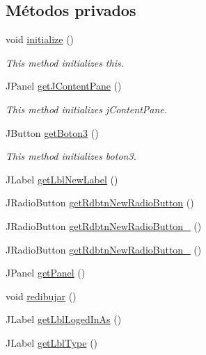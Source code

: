 \subsection*{Métodos privados}
\begin{DoxyCompactItemize}
\item 
void \mbox{\hyperlink{classgui_1_1_main_g_u_i_a2659b4cdf4e94d6ffc332f16afc46462}{initialize}} ()
\begin{DoxyCompactList}\small\item\em This method initializes this. \end{DoxyCompactList}\item 
J\+Panel \mbox{\hyperlink{classgui_1_1_main_g_u_i_ae3ce89a59dcf27273ec658ee42cd61b8}{get\+J\+Content\+Pane}} ()
\begin{DoxyCompactList}\small\item\em This method initializes j\+Content\+Pane. \end{DoxyCompactList}\item 
J\+Button \mbox{\hyperlink{classgui_1_1_main_g_u_i_a57ef624d5e53ea6591fdf4dfc776b399}{get\+Boton3}} ()
\begin{DoxyCompactList}\small\item\em This method initializes boton3. \end{DoxyCompactList}\item 
J\+Label \mbox{\hyperlink{classgui_1_1_main_g_u_i_a77a13e7a135020c180cec4b1d73a9cd9}{get\+Lbl\+New\+Label}} ()
\item 
J\+Radio\+Button \mbox{\hyperlink{classgui_1_1_main_g_u_i_ace07e2034a9e3c211356c32c3debfa1f}{get\+Rdbtn\+New\+Radio\+Button}} ()
\item 
J\+Radio\+Button \mbox{\hyperlink{classgui_1_1_main_g_u_i_a6a97236533457307ac0775a16925c461}{get\+Rdbtn\+New\+Radio\+Button\+\_}} ()
\item 
J\+Radio\+Button \mbox{\hyperlink{classgui_1_1_main_g_u_i_a7214f49eafeafd3bd5b75cc95831dd0b}{get\+Rdbtn\+New\+Radio\+Button\+\_}} ()
\item 
J\+Panel \mbox{\hyperlink{classgui_1_1_main_g_u_i_a492b26c3644e8d9eec681f49263b99a5}{get\+Panel}} ()
\item 
void \mbox{\hyperlink{classgui_1_1_main_g_u_i_a59bcdd16b1eea8840984065159d16416}{redibujar}} ()
\item 
J\+Label \mbox{\hyperlink{classgui_1_1_main_g_u_i_a09b875b4f670febbeae0e5fec8ff420d}{get\+Lbl\+Loged\+In\+As}} ()
\item 
J\+Label \mbox{\hyperlink{classgui_1_1_main_g_u_i_a0a6205c847b5d4138b54f939fc9c3487}{get\+Lbl\+Type}} ()
\end{DoxyCompactItemize}
